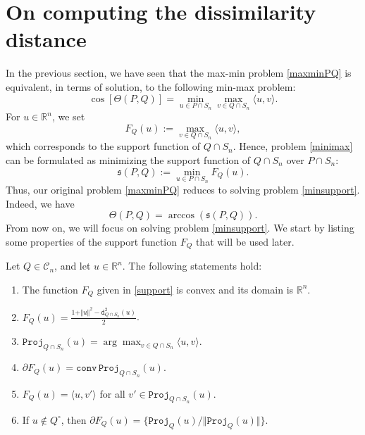 \documentclass[hidelinks,onefignum,onetabnum]{siamart250211}
\theoremstyle{definition}
\theoremstyle{remark}
\newcommand{\R}{\mathbb R}
\newcommand{\inner}[2]{\langle#1,#2\rangle}
\newcommand{\norm}[1]{\textstyle{\Vert} #1 \textstyle{\Vert}}
\newcommand{\dist}{\mathtt{d}}
\newcommand{\proj}{\mathtt{Proj}}
\begin{document}
\section{On computing the dissimilarity distance}\label{sec:comp-dist}
In the previous section, we have seen that the max-min problem \eqref{maxminPQ} is equivalent, in terms of solution, to the following min-max problem:
\begin{equation}\label{minimax}
\cos \left[\Theta(P,Q)\right]=\min_{u\in P\cap S_n}\max_{v\in Q\cap S_n}\langle u,v\rangle.
\end{equation}
For $u\in\mathbb R^n$, we set
\begin{equation}\label{support}
F_Q(u):=\max_{v\in Q\cap S_n}\langle u,v\rangle,
\end{equation}
which corresponds to the support function of $Q\cap S_n$. Hence, 
problem \eqref{minimax} can be formulated as minimizing the support function of $Q\cap S_n$ over $P\cap S_n$:
\begin{equation}\label{minsupport}
\mathfrak{s}(P,Q):=\min_{u\in P\cap S_n}F_Q(u).
\end{equation}
Thus, our original problem \eqref{maxminPQ} reduces to solving problem \eqref{minsupport}. Indeed, we have 
\[\Theta(P,Q)=\arccos\left(\mathfrak{s}(P,Q)\right).\]
From now on, we will focus on solving problem \eqref{minsupport}. We start by listing some properties of the support function $F_Q$ that will be used later. 
\begin{proposition}\label{prop FQ}
Let $Q\in\mathcal C_n$, and let $u\in\R^n$. The following statements hold:
\begin{enumerate}
\item[(a)] The function $F_Q$ given in \eqref{support} is convex and its domain is $\R^n$.
\item[(b)]  $\displaystyle F_Q(u)=\frac{1+\norm{u}^2-\dist_{Q\cap S_n}^2(u)}{2}$.
\item[(c)] $\proj_{Q\cap S_n}(u)=\arg\max_{v \in Q\cap S_n} \inner{u}{v}$.
\item[(d)] $\partial F_Q(u) = \mathtt{conv}\, \proj_{Q\cap S_n}(u)$.
\item[(e)] $F_Q(u) = \inner{u}{v'}$ for all $v'\in \proj_{Q\cap S_n}(u)$.
\item[(f)] If $u \notin Q^\circ$, then $\partial F_Q(u)=\{\proj_Q(u)/\Vert \proj_Q(u)\Vert\}$. 
\end{enumerate}
\end{proposition}
\end{document}

